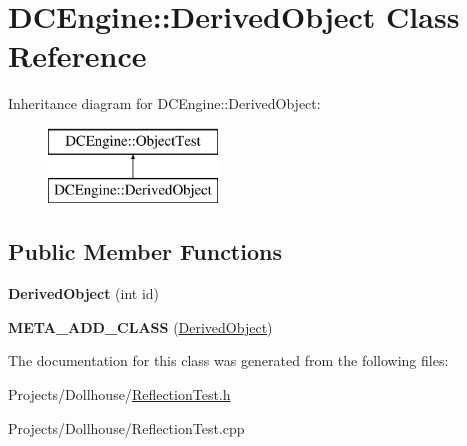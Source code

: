 \hypertarget{classDCEngine_1_1DerivedObject}{\section{D\-C\-Engine\-:\-:Derived\-Object Class Reference}
\label{classDCEngine_1_1DerivedObject}
}
Inheritance diagram for D\-C\-Engine\-:\-:Derived\-Object\-:\begin{figure}[H]
\begin{center}
\leavevmode
\includegraphics[height=2.000000cm]{classDCEngine_1_1DerivedObject}
\end{center}
\end{figure}
\subsection*{Public Member Functions}
\begin{DoxyCompactItemize}
\item 
\hypertarget{classDCEngine_1_1DerivedObject_a10debf4f7239c670c666e28efd6e6171}{{\bfseries Derived\-Object} (int id)}\label{classDCEngine_1_1DerivedObject_a10debf4f7239c670c666e28efd6e6171}

\item 
\hypertarget{classDCEngine_1_1DerivedObject_a2b82d7ed1f8a1f80161f32da90db7cb4}{{\bfseries M\-E\-T\-A\-\_\-\-A\-D\-D\-\_\-\-C\-L\-A\-S\-S} (\hyperlink{classDCEngine_1_1DerivedObject}{Derived\-Object})}\label{classDCEngine_1_1DerivedObject_a2b82d7ed1f8a1f80161f32da90db7cb4}

\end{DoxyCompactItemize}


The documentation for this class was generated from the following files\-:\begin{DoxyCompactItemize}
\item 
Projects/\-Dollhouse/\hyperlink{ReflectionTest_8h}{Reflection\-Test.\-h}\item 
Projects/\-Dollhouse/Reflection\-Test.\-cpp\end{DoxyCompactItemize}
